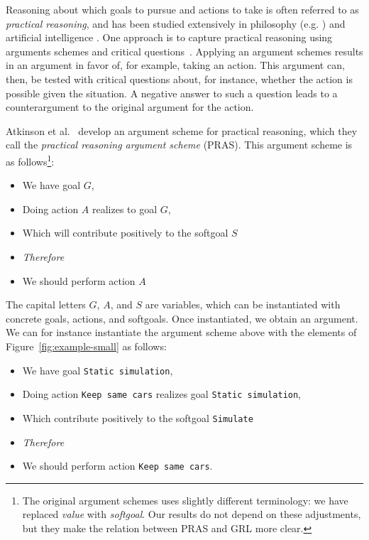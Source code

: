 Reasoning about which goals to pursue and actions to take is often referred to as \emph{practical reasoning}, and has been studied extensively in philosophy (e.g. \cite{Raz1978-RAZPR,walton1990}) and artificial intelligence \cite{bratman1987,atkinson2007}. One approach is to capture practical reasoning using arguments schemes and critical questions~\cite{walton1990}. Applying an argument schemes results in an argument in favor of, for example, taking an action. This argument can, then, be tested with critical questions about, for instance, whether the action is possible given the situation. A negative answer to such a question leads to a counterargument to the original argument for the action. 

Atkinson et al.~\cite{atkinson2007} develop an argument scheme for practical reasoning, which they call the \emph{practical reasoning argument scheme} (PRAS). This argument scheme is as follows\footnote{The original argument schemes uses slightly different terminology: we have replaced \emph{value} with \emph{softgoal}. Our results do not depend on these adjustments, but they make the relation between PRAS and GRL more clear.}:

\begin{itemize}
\item[] We have goal $G$,
\item[] Doing action $A$ realizes to goal $G$,
\item[] Which will contribute positively to the softgoal $S$
\item[] \textit{Therefore} 
\item[] We should perform action $A$
\end{itemize}

The capital letters $G$, $A$, and $S$ are variables, which can be instantiated with concrete goals, actions, and softgoals. Once instantiated, we obtain an argument. We can for instance instantiate the argument scheme above with the elements of Figure~\ref{fig:example-small} as follows:
\begin{itemize}
\item[] We have goal \texttt{Static simulation},
\item[] Doing action \texttt{Keep same cars} realizes goal \texttt{Static simulation}, 
\item[] Which contribute positively to the softgoal \texttt{Simulate} 
\item[] \textit{Therefore} 
\item[] We should perform action \texttt{Keep same cars}.
\end{itemize}

